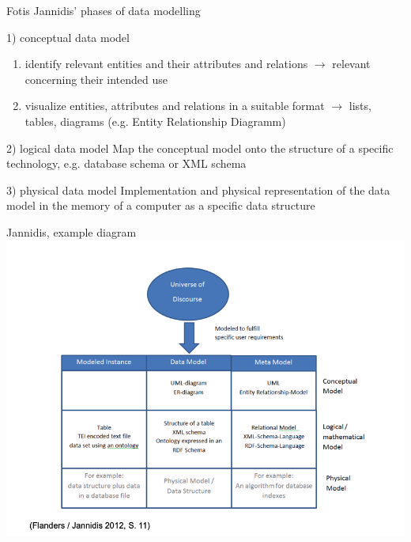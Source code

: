 \begin{frame}{Fotis Jannidis' phases of data modelling}
    \begin{alertblock}{1) conceptual data model}\footnotesize
        \begin{enumerate}
            \item identify relevant entities and their attributes and relations	$\to$ relevant concerning their intended use
            \item visualize entities, attributes and relations in a suitable format $\to$ lists, tables, diagrams (e.g. Entity Relationship Diagramm)
        \end{enumerate}
    \end{alertblock}
    \begin{alertblock}{2) logical data model}
        Map the conceptual model onto the structure of a specific technology, e.g. database schema or XML schema 
    \end{alertblock}
    \begin{alertblock}{3) physical data model}
        Implementation and physical representation of the data model in the memory of a computer as a specific data structure 
    \end{alertblock}
\end{frame}
\begin{frame}{Jannidis, example diagram}
    \includegraphics[width=\textwidth]{img/jannidis-modell.png}
\end{frame}

